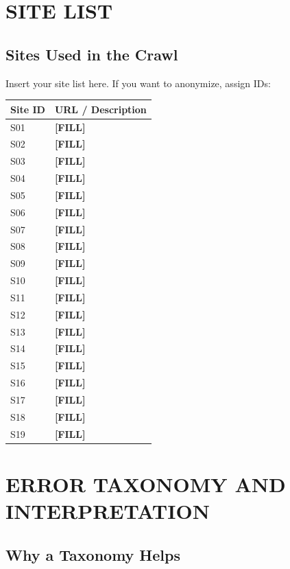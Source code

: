 \documentclass[11pt]{report}
\begin{document}
\chapter{SITE LIST}

\section{Sites Used in the Crawl}

Insert your site list here. If you want to anonymize, assign IDs:

\begin{longtable}{p{} p{}}
\toprule
\textbf{Site ID} & \textbf{URL / Description} \\
\midrule
S01 & \textbf{[FILL]} \\
S02 & \textbf{[FILL]} \\
S03 & \textbf{[FILL]} \\
S04 & \textbf{[FILL]} \\
S05 & \textbf{[FILL]} \\
S06 & \textbf{[FILL]} \\
S07 & \textbf{[FILL]} \\
S08 & \textbf{[FILL]} \\
S09 & \textbf{[FILL]} \\
S10 & \textbf{[FILL]} \\
S11 & \textbf{[FILL]} \\
S12 & \textbf{[FILL]} \\
S13 & \textbf{[FILL]} \\
S14 & \textbf{[FILL]} \\
S15 & \textbf{[FILL]} \\
S16 & \textbf{[FILL]} \\
S17 & \textbf{[FILL]} \\
S18 & \textbf{[FILL]} \\
S19 & \textbf{[FILL]} \\
\bottomrule
\end{longtable}



\chapter{ERROR TAXONOMY AND INTERPRETATION}

\section{Why a Taxonomy Helps}
\end{document}
